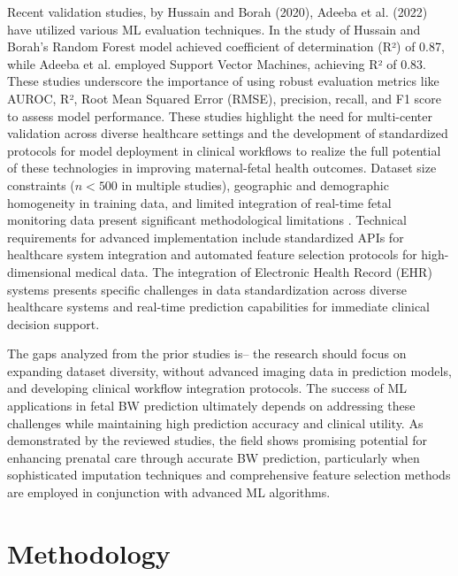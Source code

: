 \documentclass[12pt]{article}
\begin{document}
Recent validation studies, by Hussain and Borah (2020), Adeeba et al. (2022) have utilized various ML evaluation techniques. In the study of Hussain and Borah's Random Forest model achieved coefficient of determination (R²) of 0.87, while Adeeba et al. employed Support Vector Machines, achieving R² of 0.83. These studies underscore the importance of using robust evaluation metrics like AUROC, R², Root Mean Squared Error (RMSE), precision, recall, and F1 score to assess model performance\cite{19A}. These studies highlight the need for multi-center validation across diverse healthcare settings and the development of standardized protocols for model deployment in clinical workflows to realize the full potential of these technologies in improving maternal-fetal health outcomes. Dataset size constraints ($n<500$ in multiple studies), geographic and demographic homogeneity in training data, and limited integration of real-time fetal monitoring data present significant methodological limitations \cite{20A}. Technical requirements for advanced implementation include standardized APIs for healthcare system integration and automated feature selection protocols for high-dimensional medical data. The integration of Electronic Health Record (EHR) systems presents specific challenges in data standardization across diverse healthcare systems and real-time prediction capabilities for immediate clinical decision support\cite{21A}. 

The gaps analyzed from the prior studies is– the research should focus on expanding dataset diversity, without advanced imaging data in prediction models, and developing clinical workflow integration protocols. The success of ML applications in fetal BW prediction ultimately depends on addressing these challenges while maintaining high prediction accuracy and clinical utility. As demonstrated by the reviewed studies, the field shows promising potential for enhancing prenatal care through accurate BW prediction, particularly when sophisticated imputation techniques and comprehensive feature selection methods are employed in conjunction with advanced ML algorithms.


\section{Methodology}
\end{document}
